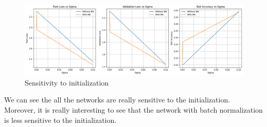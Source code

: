 \documentclass{article}
\begin{document}
\begin{figure}[H]
    \centering
    \includegraphics[width=\linewidth]{Result_Pics/sensitivity to initialization.png}
    \caption{Sensitivity to initialization}
\end{figure}

We can see the all the networks are really sensitive to the initialization. Moreover, it is really interesting to see that the network with batch normalization is less sensitive to the initialization. \\
\end{document}
